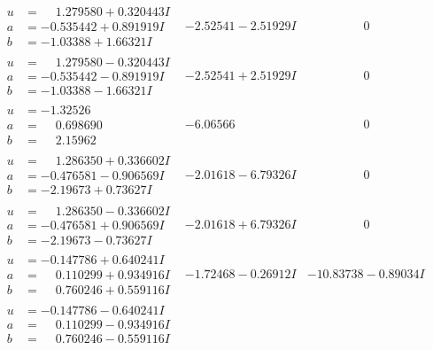 \documentclass[1p]{elsarticle_modified}
\theoremstyle{definition}
\begin{document}
$$\begin{array}{c|c|c}
\begin{aligned}
u &= \phantom{-}1.279580 + 0.320443 I \\
a &= -0.535442 + 0.891919 I \\
b &= -1.03388 + 1.66321 I\end{aligned}
 & -2.52541 - 2.51929 I & \phantom{-0.000000 } 0 \\ \hline\begin{aligned}
u &= \phantom{-}1.279580 - 0.320443 I \\
a &= -0.535442 - 0.891919 I \\
b &= -1.03388 - 1.66321 I\end{aligned}
 & -2.52541 + 2.51929 I & \phantom{-0.000000 } 0 \\ \hline\begin{aligned}
u &= -1.32526\phantom{ +0.000000I} \\
a &= \phantom{-}0.698690\phantom{ +0.000000I} \\
b &= \phantom{-}2.15962\phantom{ +0.000000I}\end{aligned}
 & -6.06566\phantom{ +0.000000I} & \phantom{-0.000000 } 0 \\ \hline\begin{aligned}
u &= \phantom{-}1.286350 + 0.336602 I \\
a &= -0.476581 - 0.906569 I \\
b &= -2.19673 + 0.73627 I\end{aligned}
 & -2.01618 - 6.79326 I & \phantom{-0.000000 } 0 \\ \hline\begin{aligned}
u &= \phantom{-}1.286350 - 0.336602 I \\
a &= -0.476581 + 0.906569 I \\
b &= -2.19673 - 0.73627 I\end{aligned}
 & -2.01618 + 6.79326 I & \phantom{-0.000000 } 0 \\ \hline\begin{aligned}
u &= -0.147786 + 0.640241 I \\
a &= \phantom{-}0.110299 + 0.934916 I \\
b &= \phantom{-}0.760246 + 0.559116 I\end{aligned}
 & -1.72468 - 0.26912 I & -10.83738 - 0.89034 I \\ \hline\begin{aligned}
u &= -0.147786 - 0.640241 I \\
a &= \phantom{-}0.110299 - 0.934916 I \\
b &= \phantom{-}0.760246 - 0.559116 I\end{aligned}

\end{array}$$
\end{document}

